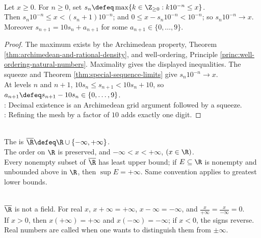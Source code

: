 \begin{proposition} \label{prop:decimal-truncations-squeeze-real} \\
Let $x\geq0$. For $n\geq0$, set $s_n\defeq\max\{k\in\Z_{\geq0}:k10^{-n}\leq x\}$.\\
Then $s_n10^{-n}\leq x < (s_n+1)10^{-n}$; and $0\leq x-s_n10^{-n}<10^{-n}$;  so $s_n10^{-n}\to x$.\\
Moreover $s_{n+1}=10s_n+a_{n+1}$ for some $a_{n+1}\in\{0,\ldots,9\}$.
\begin{proof}
The maximum exists by the Archimedean property, Theorem \ref{thm:archimedean-and-rational-density}, and well-ordering, Principle \ref{princ:well-ordering-natural-numbers}. Maximality gives the displayed inequalities. The squeeze and Theorem \ref{thm:special-sequence-limits} give $s_n10^{-n}\to x$.\\
At levels $n$ and $n+1$, $10s_n\leq s_{n+1}<10s_n+10$, so $a_{n+1}\defeq s_{n+1}-10s_n\in\{0,\ldots,9\}$.\\
: Decimal existence is an Archimedean grid argument followed by a squeeze.\\
: Refining the mesh by a factor of $10$ adds exactly one digit.
\end{proof}
\end{proposition}

\begin{definition} \label{def:extended-real-number-system} \\
The  is $\overline{\R}\defeq\R\cup\{-\infty,+\infty\}$.\\
The order on $\R$ is preserved, and $-\infty<x<+\infty$, $(x\in\R)$.\\
Every nonempty subset of $\overline{\R}$ has least upper bound; if $E\subseteq\R$ is nonempty and unbounded above in $\R$, then $\sup E=+\infty$. Same convention applies to greatest lower bounds.
\end{definition}

\begin{remark} \label{rem:extended-real-arithmetic-conventions} \\
$\overline{\R}$ is not a field. For real $x$, $x+\infty=+\infty$, $x-\infty=-\infty$, and $\frac{x}{+\infty}=\frac{x}{-\infty}=0$.\\
If $x>0$, then $x(+\infty)=+\infty$ and $x(-\infty)=-\infty$; if $x<0$, the signs reverse.\\
Real numbers are called  when one wants to distinguish them from $\pm\infty$.
\end{remark}
